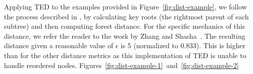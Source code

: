 Applying TED to the examples provided in Figure~\ref{fig:dist-example}, we follow the process described in \cite{Zhang_Shasha_1989}, by calculating key roots (the rightmost parent of each subtree) and then computing forest distance. For the specific mechanics of this distance, we refer the reader to the work by Zhang and Shasha~\cite{Zhang_Shasha_1989}. The resulting distance given a reasonable value of $\epsilon$ is 5 (normalized to 0.833). This is higher than for the other distance metrics as this implementation of TED is unable to handle reordered nodes.
Figures~\ref{fig:dist-example-1}~and~\ref{fig:dist-example-2}










